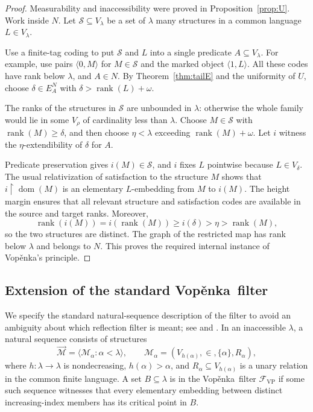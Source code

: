 \documentclass[11pt,letterpaper]{article}
\theoremstyle{definition}
\numberwithin{equation}{section}
\newcommand{\rank}{\operatorname{rank}}
\newcommand{\restr}{\mathbin{\upharpoonright}}
\newcommand{\Vop}{Vop\v{e}nka}
\newcommand{\pair}[2]{\langle #1,#2\rangle}
\begin{document}
\begin{proof}
Measurability and inaccessibility were proved in Proposition~\ref{prop:U}. Work inside $N$. Let $\mathcal S\subseteq V_\lambda$ be a set of $\lambda$ many structures in a common language $L\in V_\lambda$.

Use a finite-tag coding to put $\mathcal S$ and $L$ into a single predicate $A\subseteq V_\lambda$. For example, use pairs $\pair0M$ for $M\in\mathcal S$ and the marked object $\pair1L$. All these codes have rank below $\lambda$, and $A\in N$. By Theorem~\ref{thm:tailE} and the uniformity of $U$, choose $\delta\in E_A^N$ with $\delta>\rank(L)+\omega$.

The ranks of the structures in $\mathcal S$ are unbounded in $\lambda$: otherwise the whole family would lie in some $V_\rho$ of cardinality less than $\lambda$. Choose $M\in\mathcal S$ with $\rank(M)\ge\delta$, and then choose $\eta<\lambda$ exceeding $\rank(M)+\omega$. Let $i$ witness the $\eta$-extendibility of $\delta$ for $A$.

Predicate preservation gives $i(M)\in\mathcal S$, and $i$ fixes $L$ pointwise because $L\in V_\delta$. The usual relativization of satisfaction to the structure $M$ shows that $i\restr\operatorname{dom}(M)$ is an elementary $L$-embedding from $M$ to $i(M)$. The height margin ensures that all relevant structure and satisfaction codes are available in the source and target ranks. Moreover,
\[
 \rank(i(M))=i(\rank(M))\ge i(\delta)>\eta>\rank(M),
\]
so the two structures are distinct. The graph of the restricted map has rank below $\lambda$ and belongs to $N$. This proves the required internal instance of \Vop's principle.
\end{proof}

\subsection{Extension of the standard \Vop\ filter}

We specify the standard natural-sequence description of the filter to avoid an ambiguity about which reflection filter is meant; see \cite[\S5]{perlmutter} and \cite[\S2.2]{poveda}. In an inaccessible $\lambda$, a natural sequence consists of structures
\[
 \vec{\mathcal M}=\langle\mathcal M_\alpha:\alpha<\lambda\rangle,
 \qquad
 \mathcal M_\alpha=(V_{h(\alpha)},\in,\{\alpha\},R_\alpha),
\]
where $h:\lambda\to\lambda$ is nondecreasing, $h(\alpha)>\alpha$, and $R_\alpha\subseteq V_{h(\alpha)}$ is a unary relation in the common finite language. A set $B\subseteq\lambda$ is in the \Vop\ filter $\mathcal F_{\mathrm{VP}}$ if some such sequence witnesses that every elementary embedding between distinct increasing-index members has its critical point in $B$.
\end{document}
